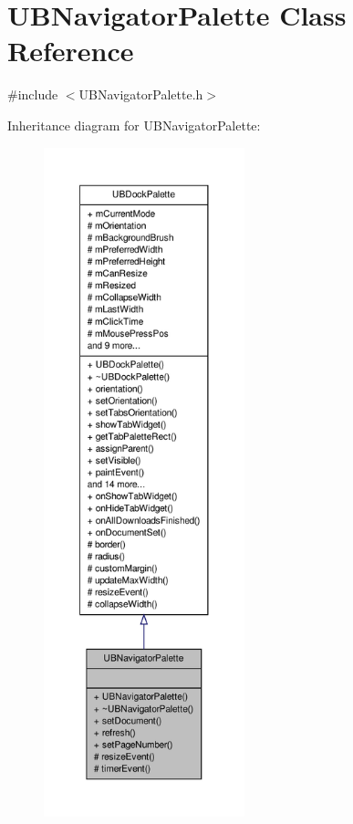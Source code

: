\hypertarget{class_u_b_navigator_palette}{\section{U\-B\-Navigator\-Palette Class Reference}
\label{df/db6/class_u_b_navigator_palette}
}


{\ttfamily \#include $<$U\-B\-Navigator\-Palette.\-h$>$}



Inheritance diagram for U\-B\-Navigator\-Palette\-:
\nopagebreak
\begin{figure}[H]
\begin{center}
\leavevmode
\includegraphics[height=550pt]{d1/dfe/class_u_b_navigator_palette__inherit__graph}
\end{center}
\end{figure}



